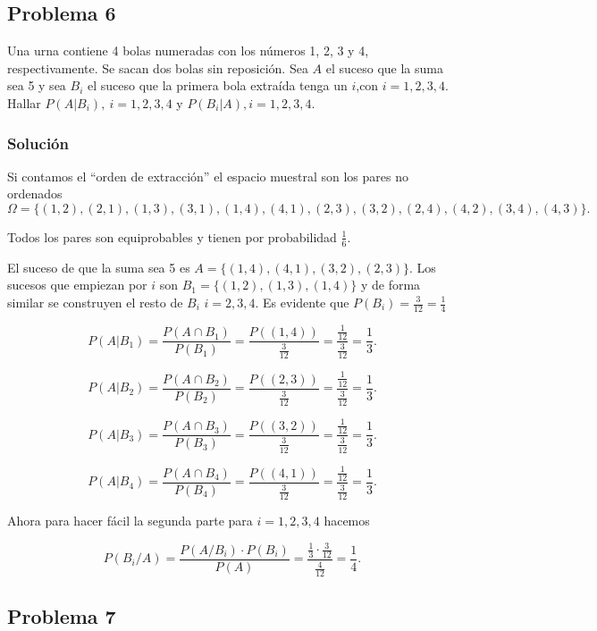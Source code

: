 \documentclass[
]{article}
\begin{document}
\hypertarget{problema-6}{%
\subsection{Problema 6}\label{problema-6}}

Una urna contiene 4 bolas numeradas con los números 1, 2, 3 y 4,
respectivamente. Se sacan dos bolas sin reposición. Sea \(A\) el suceso
que la suma sea 5 y sea \(B_i\) el suceso que la primera bola extraída
tenga un \(i\),con \(i=1,2,3,4\). Hallar \(P(A|B_i),\  i=1,2,3,4\) y
\(P(B_i|A), i=1,2,3,4\).

\hypertarget{soluciuxf3n-6}{%
\subsubsection{Solución}\label{soluciuxf3n-6}}

Si contamos el ``orden de extracción'' el espacio muestral son los pares
no ordenados
\[\Omega =\{(1,2),(2,1),(1,3),(3,1),(1,4),(4,1),(2,3),(3,2),(2,4),(4,2),(3,4),(4,3)\}.\]

Todos los pares son equiprobables y tienen por probabilidad
\(\frac{1}{6}.\)

El suceso de que la suma sea 5 es \(A=\{(1,4),(4,1),(3,2),(2,3)\}\). Los
sucesos que empiezan por \(i\) son \(B_1=\{(1,2),(1,3),(1,4)\}\) y de
forma similar se construyen el resto de \(B_i\) \(i=2,3,4\). Es evidente
que \(P(B_i)=\frac{3}{12}=\frac{1}{4}\)

\[
P(A|B_1)=\frac{P(A\cap B_1)}{P(B_1)}=\frac{P((1,4))}{\frac{3}{12}}=
\frac{\frac{1}{12}}{\frac{3}{12}}=\frac{1}{3}.
\]

\[
P(A|B_2)=\frac{P(A\cap B_2)}{P(B_2)}=\frac{P((2,3))}{\frac{3}{12}}=
\frac{\frac{1}{12}}{\frac{3}{12}}=\frac{1}{3}.
\]

\[
P(A|B_3)=\frac{P(A\cap B_3)}{P(B_3)}=\frac{P((3,2))}{\frac{3}{12}}=
\frac{\frac{1}{12}}{\frac{3}{12}}=\frac{1}{3}.
\]

\[P(A|B_4)=\frac{P(A\cap B_4)}{P(B_4)}=\frac{P((4,1))}{\frac{3}{12}}=
\frac{\frac{1}{12}}{\frac{3}{12}}=\frac{1}{3}.\]

Ahora para hacer fácil la segunda parte para \(i=1,2,3,4\) hacemos

\[
P(B_i/A)=\frac{P(A/B_i)\cdot P(B_i)}{P(A)}=\frac{\frac{1}{3}\cdot \frac{3}{12}}{\frac{4}{12}}=\frac{1}{4}.
\]

\hypertarget{problema-7}{%
\subsection{Problema 7}\label{problema-7}}
\end{document}
